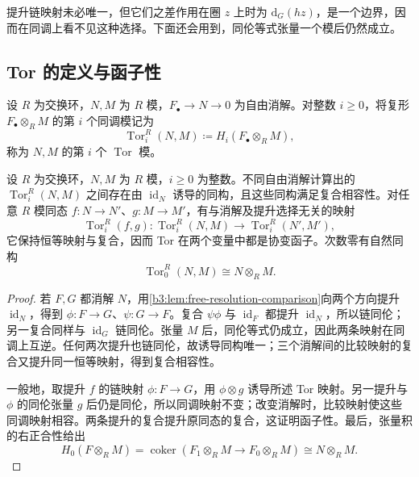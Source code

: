 提升链映射未必唯一，但它们之差作用在圈 \(z\) 上时为 \(\mathrm{d}_G(hz)\)，是一个边界，因而在同调上看不见这种选择。下面还会用到，同伦等式张量一个模后仍然成立。

\subsection{Tor 的定义与函子性}
\label{b3:subsec:1505:02}

\begin{definition}\label{b3:def:tor-koszul-recall}
	设 \(R\) 为交换环，\(N,M\) 为 \(R\) 模，\(F_\bullet\rightarrow N\rightarrow0\) 为自由消解。对整数 \(i\ge0\)，将复形 \(F_\bullet\otimes_RM\) 的第 \(i\) 个同调模记为
	\[
		\operatorname{Tor}_i^R(N,M)\coloneqq H_i(F_\bullet\otimes_RM),
	\]
	称为 \(N,M\) 的第 \(i\) 个 \(\operatorname{Tor}\) 模。
\end{definition}

\begin{corollary}\label{b3:cor:tor-well-defined-functor}
	设 \(R\) 为交换环，\(N,M\) 为 \(R\) 模，\(i\ge0\) 为整数。不同自由消解计算出的 \(\operatorname{Tor}_i^R(N,M)\) 之间存在由 \(\operatorname{id}_N\) 诱导的同构，且这些同构满足复合相容性。对任意 \(R\) 模同态 \(f:N\rightarrow N'\)、\(g:M\rightarrow M'\)，有与消解及提升选择无关的映射
	\[
		\operatorname{Tor}_i^R(f,g): \operatorname{Tor}_i^R(N,M)\longrightarrow\operatorname{Tor}_i^R(N',M'),
	\]
	它保持恒等映射与复合，因而 Tor 在两个变量中都是协变函子。次数零有自然同构
	\[
		\operatorname{Tor}_0^R(N,M)\cong N\otimes_RM.
	\]
\end{corollary}
\begin{proof}
	若 \(F,G\) 都消解 \(N\)，用\cref{b3:lem:free-resolution-comparison}向两个方向提升 \(\operatorname{id}_N\)，得到 \(\phi:F\rightarrow G\)、\(\psi:G\rightarrow F\)。复合 \(\psi\phi\) 与 \(\operatorname{id}_F\) 都提升 \(\operatorname{id}_N\)，所以链同伦；另一复合同样与 \(\operatorname{id}_G\) 链同伦。张量 \(M\) 后，同伦等式仍成立，因此两条映射在同调上互逆。任何两次提升也链同伦，故诱导同构唯一；三个消解间的比较映射的复合又提升同一恒等映射，得到复合相容性。

	一般地，取提升 \(f\) 的链映射 \(\phi:F\rightarrow G\)，用 \(\phi\otimes g\) 诱导所述 Tor 映射。另一提升与 \(\phi\) 的同伦张量 \(g\) 后仍是同伦，所以同调映射不变；改变消解时，比较映射使这些同调映射相容。两条提升的复合提升原同态的复合，这证明函子性。最后，张量积的右正合性给出
	\[
		H_0(F\otimes_RM) =\operatorname{coker}(F_1\otimes_RM\longrightarrow F_0\otimes_RM) \cong N\otimes_RM.
	\]
\end{proof}

